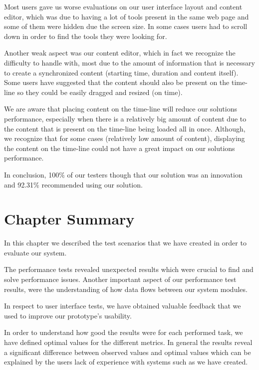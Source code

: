 Most users gave us worse evaluations on our user interface layout and content editor, which was due to having a lot of tools present in the same web page and some of them were hidden due the screen size. In some cases users had to scroll down in order to find the tools they were looking for. 

Another weak aspect was our content editor, which in fact we recognize the difficulty to handle with, most due to the amount of information that is necessary to create a synchronized content (starting time, duration and content itself). Some users have suggested that the content should also be present on the time-line so they could be easily dragged and resized (on time).

We are aware that placing content on the time-line will reduce our solutions performance, especially when there is a relatively big amount of content due to the content that is present on the time-line being loaded all in once. Although, we recognize that for some cases (relatively low amount of content), displaying the content on the time-line could not have a great impact on our solutions performance. 

In conclusion, 100\% of our testers though that our solution was an innovation and 92.31\% recommended using our solution.


\section{Chapter Summary}
\label{evaluation:summary}

In this chapter we described the test scenarios that we have created in order to evaluate our system. 

The performance tests revealed unexpected results which were crucial to find and solve performance issues. Another important aspect of our performance test results, were the understanding of how data flows between our system modules.

In respect to user interface tests, we have obtained valuable feedback that we used to improve our prototype's usability. 

In order to understand how good the results were for each performed task, we have defined optimal values for the different metrics. In general the results reveal a significant difference between observed values and optimal values which can be explained by the users lack of experience with systems such as we have created.